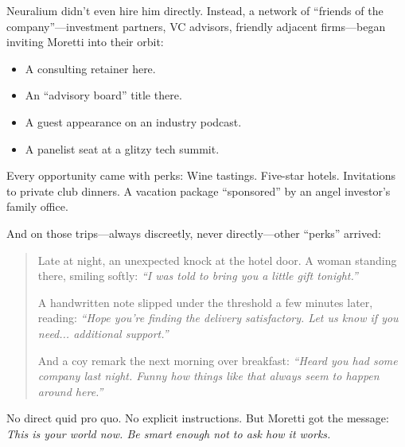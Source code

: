 Neuralium didn’t even hire him directly. Instead, a network of “friends of the company”—investment partners, VC advisors, friendly adjacent firms—began inviting Moretti into their orbit:
\begin{itemize}
  \item A consulting retainer here.
  \item An “advisory board” title there.
  \item A guest appearance on an industry podcast.
  \item A panelist seat at a glitzy tech summit.
\end{itemize}

Every opportunity came with perks:  Wine tastings. Five-star hotels. Invitations to private club dinners. A vacation package “sponsored” by an angel investor’s family office.

And on those trips—always discreetly, never directly—other “perks” arrived:

\begin{quote}
Late at night, an unexpected knock at the hotel door.  
A woman standing there, smiling softly:  \textit{“I was told to bring you a little gift tonight.”}

A handwritten note slipped under the threshold a few minutes later, reading:  
\textit{“Hope you’re finding the delivery satisfactory. Let us know if you need... additional support.”}

And a coy remark the next morning over breakfast:  
\textit{“Heard you had some company last night. Funny how things like that always seem to happen around here.”}
\end{quote}


No direct quid pro quo.  No explicit instructions.  But Moretti got the message:  \textit{This is your world now. Be smart enough not to ask how it works.}

